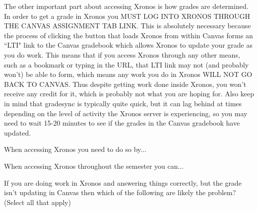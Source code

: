 \documentclass{ximera}
\begin{document}
The other important part about accessing Xronos is how grades are determined. In order to get a grade in Xronos you MUST LOG INTO XRONOS THROUGH THE CANVAS ASSIGNMENT TAB LINK. This is absolutely necessary because the process of clicking the button that loads Xronos from within Canvas forms an ``LTI" link to the Canvas gradebook which allows Xronos to update your grade as you do work. This means that if you access Xronos through any other means, such as a bookmark or typing in the URL, that LTI link may not (and probably won't) be able to form, which means any work you do in Xronos WILL NOT GO BACK TO CANVAS. Thus despite getting work done inside Xronos, you won't receive any credit for it, which is probably not what you are hoping for. Also keep in mind that gradesync is typically quite quick, but it can lag behind at times depending on the level of activity the Xronos server is experiencing, so you may need to wait 15-20 minutes to see if the grades in the Canvas gradebook have updated.

\begin{problem}
    When accessing Xronos you need to do so by...
    \begin{selectAll}
    \end{selectAll}
    \begin{problem}
        When accessing Xronos throughout the semester you can...
        \begin{selectAll}
        \end{selectAll}
    \end{problem}
\end{problem}

\begin{problem}
    If you are doing work in Xronos and answering things correctly, but the grade isn't updating in Canvas then which of the following are likely the problem? (Select all that apply)
    \begin{selectAll}
    \end{selectAll}
\end{problem}
\end{document}
